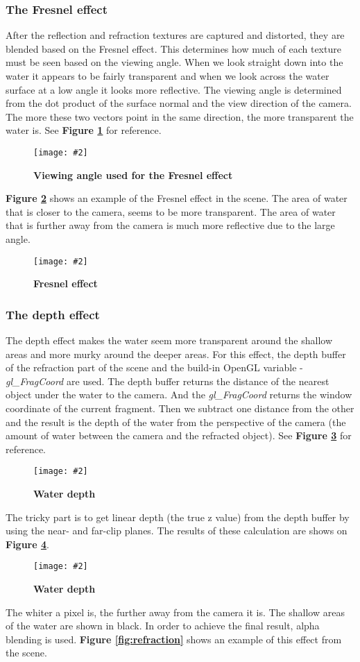 \documentclass[10pt, a4paper]{article}
\newcommand{\figuremacro}[5]{
    \begin{figure}[#1]
        \centering
        \texttt{[image: \#2]}
        \caption[#3]{\textbf{#3}#4}
        \label{fig:#2}
    \end{figure}
}
\begin{document}
	\subsubsection{The Fresnel effect}
	After the reflection and refraction textures are captured and distorted, they are blended based on the Fresnel effect. This determines how much of each texture must be seen based on the viewing angle. When we look straight down into the water it appears to be fairly transparent and when we look across the water surface at a low angle it looks more reflective. The viewing angle is determined from the dot product of the surface normal and the view direction of the camera. The more these two vectors point in the same direction, the more transparent the water is. See \textbf{Figure {\ref{fig:fresnelDrawing}}} for reference.
	\figuremacro{h}{fresnelDrawing}{Viewing angle used for the Fresnel effect}{ }{1.0}
	
	\textbf{Figure {\ref{fig:fresnelEffect}}} shows an example of the Fresnel effect in the scene. The area of water that is closer to the camera, seems to be more transparent. The area of water that is further away from the camera is much more reflective due to the large angle.
	\figuremacro{h}{fresnelEffect}{Fresnel effect}{ }{0.9}
	\subsubsection{The depth effect}
	The depth effect makes the water seem more transparent around the shallow areas and more murky around the deeper areas. For this effect, the depth buffer of the refraction part of the scene and the build-in OpenGL variable - \textit{gl\_FragCoord} are used. The depth buffer returns the distance of the nearest object under the water to the camera. And the \textit{gl\_FragCoord} returns the window coordinate of the current fragment. Then we subtract one distance from the other and the result is the depth of the water from the perspective of the camera (the amount of water between the camera and the refracted object). See \textbf{Figure {\ref{fig:refractionDistance}}} for reference.
	\figuremacro{h}{refractionDistance}{Water depth}{ }{1.0}
	
	The tricky part is to get linear depth (the true z value) from the depth buffer by using the near- and far-clip planes. The results of these calculation are shows on \textbf{Figure {\ref{fig:depthBuffer}}}.
	\figuremacro{h}{depthBuffer}{Water depth}{ }{1.0}
	
	The whiter a pixel is, the further away from the camera it is. The shallow areas of the water are shown in black. In order to achieve the final result, alpha blending is used. \textbf{Figure {\ref{fig:refraction}}} shows an example of this effect from the scene.
\end{document}
